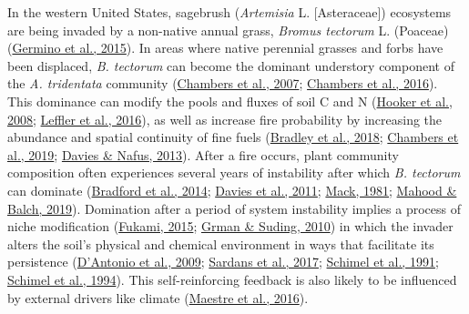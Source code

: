\documentclass[
  11pt,
  a4paper,
]{article}
\begin{document}
In the western United States, sagebrush (\emph{Artemisia} L. {[}Asteraceae{]}) ecosystems are being invaded by a non-native annual grass, \emph{Bromus tectorum} L. (Poaceae) (\protect\hyperlink{ref-Germino2016}{Germino et al., 2015}). In areas where native perennial grasses and forbs have been displaced, \emph{B. tectorum} can become the dominant understory component of the \emph{A. tridentata} community (\protect\hyperlink{ref-Chambers2007}{Chambers et al., 2007}; \protect\hyperlink{ref-Chambers2016}{Chambers et al., 2016}). This dominance can modify the pools and fluxes of soil C and N (\protect\hyperlink{ref-Hooker2008biogeochem}{Hooker et al., 2008}; \protect\hyperlink{ref-Leffler2016}{Leffler et al., 2016}), as well as increase fire probability by increasing the abundance and spatial continuity of fine fuels (\protect\hyperlink{ref-Bradley2018}{Bradley et al., 2018}; \protect\hyperlink{ref-Chambers2019}{Chambers et al., 2019}; \protect\hyperlink{ref-Davies2013}{Davies \& Nafus, 2013}). After a fire occurs, plant community composition often experiences several years of instability after which \emph{B. tectorum} can dominate (\protect\hyperlink{ref-Bradford2014}{Bradford et al., 2014}; \protect\hyperlink{ref-Davies2011}{Davies et al., 2011}; \protect\hyperlink{ref-Mack1981}{Mack, 1981}; \protect\hyperlink{ref-Mahood2019}{Mahood \& Balch, 2019}). Domination after a period of system instability implies a process of niche modification (\protect\hyperlink{ref-Fukami2015}{Fukami, 2015}; \protect\hyperlink{ref-Grman2010}{Grman \& Suding, 2010}) in which the invader alters the soil's physical and chemical environment in ways that facilitate its persistence (\protect\hyperlink{ref-DAntonio2009}{D'Antonio et al., 2009}; \protect\hyperlink{ref-Sardans2017}{Sardans et al., 2017}; \protect\hyperlink{ref-Schimel1991}{Schimel et al., 1991}; \protect\hyperlink{ref-Schimel1994}{Schimel et al., 1994}). This self-reinforcing feedback is also likely to be influenced by external drivers like climate (\protect\hyperlink{ref-Maestre2016}{Maestre et al., 2016}).
\end{document}

